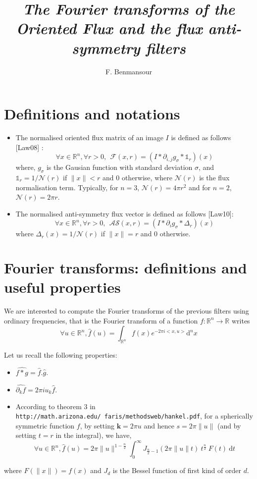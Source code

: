 \documentclass[11pt]{amsart}
\author {F. Benmansour}
\title{\textit{The Fourier transforms of the Oriented Flux and the flux anti-symmetry filters}}
\begin{document}
\maketitle

\section{Definitions and notations}
\begin{itemize}
\item The normalised oriented flux matrix of an image $I$ is defined as follows [Law08] :
\begin{equation}\label{eq:OF}
\forall x\in\mathbb{R}^n,\forall r >0, ~~\mathcal{F}(x, r) = (I* \partial_{i, j} g_{\sigma} *\mathds{1}_r)(x)
\end{equation}
where, $g_\sigma$ is the Gausian function with standard deviation $\sigma$, and $\mathds{1}_r = 1/ \mathcal{N}(r)$ if $\|x\| < r$ and 0 otherwise, where $\mathcal{N}(r)$ is the flux normalisation term. Typically, for $n = 3$,  $\mathcal{N}(r) = 4\pi r^2$ and for $n = 2$, $\mathcal{N}(r) = 2\pi r$.
\item The normalised anti-symmetry flux vector is defined as follows [Law10]:
\begin{equation}\label{eq:AF}
\forall x\in\mathbb{R}^n,\forall r >0, ~~\mathcal{AS}(x, r) = (I* \partial_{i} g_{\sigma} *\Delta_r)(x)
\end{equation}
where $\Delta_r(x) = 1/ \mathcal{N}(r)$ if $\|x\| = r$ and 0 otherwise.
\end{itemize}

\section{Fourier transforms: definitions and useful properties}
We are interested to compute the Fourier transforms of the previous filters using ordinary frequencies, that is the Fourier transform of a function $f:\mathbb{R}^n\rightarrow \mathbb{R}$ writes
\begin{equation}\label{eq:FourierDef}
\forall u\in\mathbb{R}^n,  \hat{f}(u) = \int_{\mathbb{R}^n} f(x)e^{-2\pi i <x, u>} \mathrm{d}^n x
\end{equation}

Let us recall the following properties:
\begin{itemize}
\item $\widehat{f*g} = \hat{f} . \hat{g}$.
\item $\widehat{\partial_k f} = 2\pi i u_k \hat{f}$.
\item According to theorem 3 in \texttt{http://math.arizona.edu/~faris/methodsweb/hankel.pdf}, for a spherically symmetric function $f$, 
by setting $\mathbf{k} = 2\pi u$ and hence $s = 2\pi \| u\|$ (and by setting $t = r$ in the integral), we have,
\begin{equation}\label{eq:Hankel}
\forall u\in\mathbb{R}^n,  \hat{f}(u) = 2\pi \|u\|^{1-\frac{n}{2}} \int_0^\infty J_{\frac{n}{2}-1}(2\pi \|u\| t) ~t^{\frac{n}{2}}~ F(t) ~\mathrm{d}t
\end{equation}
\end{itemize}
where $F(\|x\|) = f(x)$ and $J_d$ is the Bessel function of first kind of order $d$.
\end{document}
